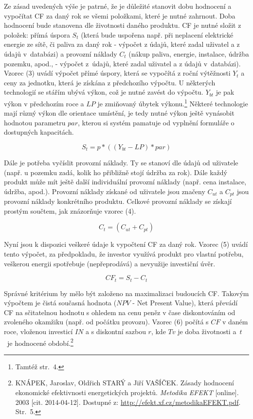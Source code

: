 \documentclass[11pt,a4paper]{article}
\begin{document}
Ze zásad uvedených výše je patrné, že je důležité stanovit dobu hodnocení a vypočítat CF za daný rok se všemi položkami, které je nutné zahrnout. Doba hodnocení bude stanovena dle životnosti daného produktu. CF je nutné složit z položek: přímá úspora $S_{t}$ (která bude uspořena např. při neplacení elektrické energie ze sítě, či paliva za daný rok - výpočet z údajů, které zadal uživatel a z údajů v~databázi) a provozní náklady $C_{t}$ (nákup paliva, energie, instalace, údržba pozemku, apod., - výpočet z~údajů, které zadal uživatel a z údajů v~databázi). Vzorec (3) uvádí výpočet přímé úspory, která se vypočítá z roční výtěžnosti $Y_{t}$ a ceny za jednotku, která je získána z předchozího výpočtu. U některých technologií se stářím ubývá výkon, což je nutné zavést do výpočtu. $Y_{bt}$ je pak výkon v předchozím roce a $LP$ je zmiňovaný úbytek výkonu.\footnote{Tamtéž str.~4.} Některé technologie mají různý výkon dle orientace umístění, je tedy nutné výkon ještě vynásobit hodnotou parametru $par$, kterou si systém pamatuje od vyplnění formuláře o dostupných kapacitách. 

\begin{equation}
 S_{t} = p * ((Y_{bt} - LP ) * par) 
\end{equation}

Dále je potřeba vyčíslit provozní náklady. Ty se stanoví dle údajů od uživatele (např. u pozemku zadá, kolik ho přibližně stojí údržba za rok). Dále každý produkt může mít ještě další individuální provozní náklady (např. cena instalace, údržba, apod.). Provozní náklady získané od uživatele jsou značeny $C_{ut}$ a $C_{pt}$ jsou provozní náklady konkrétního produktu. Celkové provozní náklady se získají prostým součtem, jak znázorňuje vzorec (4).

\begin{equation}
C_{t} = (C_{ut} + C_{pt})
\end{equation}

Nyní jsou k dispozici veškeré údaje k vypočtení CF za daný rok. Vzorec (5) uvádí tento výpočet, za předpokladu, že investor využívá produkt pro vlastní potřebu, veškerou energii spotřebuje (nepřeprodává) a nevyužije investiční úvěr.

\begin{equation}
CF_{t} =  S_{t} - C_{t}
\end{equation}

Správné kritérium by mělo být založeno na maximalizaci budoucích CF. Takovým výpočtem je čistá současná hodnota ($NPV$ - Net Present Value), která převádí CF na sčitatelnou hodnotu s ohledem na cenu peněz v čase diskontováním od zvoleného okamžiku (např. od počátku provozu). Vzorec (6) počítá s $CF$ v daném roce, vloženou investicí $IN$ a s diskontní sazbou $r$, kde $Tv$ je doba životnosti a~$t$~je hodnocené období.\footnote{KNÁPEK, Jaroslav, Oldřich STARÝ a Jiří VAŠÍČEK. Zásady hodnocení ekonomické efektivnosti energetických projektů. \textit{Metodika EFEKT} [online]. 2003 [cit. 2014-04-12]. Dostupné z: \url{http://efekt.xf.cz/metodikaEFEKT.pdf}. Str.~5.}
\end{document}
